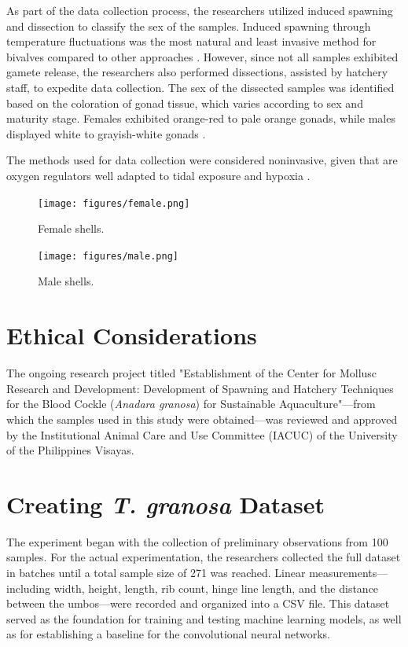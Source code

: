 As part of the data collection process, the researchers utilized induced spawning and dissection to classify the sex of the samples. Induced spawning through temperature fluctuations was the most natural and least invasive method for bivalves compared to other approaches \cite{aji}. However, since not all samples exhibited gamete release, the researchers also performed dissections, assisted by hatchery staff, to expedite data collection. The sex of the dissected samples was identified based on the coloration of gonad tissue, which varies according to sex and maturity stage. Females exhibited orange-red to pale orange gonads, while males displayed white to grayish-white gonads \cite{may2021}.

The methods used for data collection were considered noninvasive, given that \Tgranosa are oxygen regulators well adapted to tidal exposure and hypoxia \cite{davenport1986}.

\begin{figure}[!htbp]
	\centering
	\texttt{[image: figures/female.png]}
	\caption{Female \Tgranosa shells.}
	\label{fig:granosa_femaleshells}
\end{figure}

\begin{figure}[!htbp]
	\centering
	\texttt{[image: figures/male.png]}
	\caption{Male \Tgranosa shells.}
	\label{fig:granosa_maleshells}
\end{figure}

\section{Ethical Considerations}
\label{sec:ethical}

The ongoing research project titled "Establishment of the Center for Mollusc Research and Development: Development of Spawning and Hatchery Techniques for the Blood Cockle (\textit{Anadara granosa}) for Sustainable Aquaculture"—from which the samples used in this study were obtained—was reviewed and approved by the Institutional Animal Care and Use Committee (IACUC) of the University of the Philippines Visayas. 


\section{Creating \textit{T. granosa} Dataset}
\label{sec:dataset}

The experiment began with the collection of preliminary observations from 100 \Tgranosa samples. For the actual experimentation, the researchers collected the full dataset in batches until a total sample size of 271 \Tgranosa was reached. Linear measurements—including width, height, length, rib count, hinge line length, and the distance between the umbos—were recorded and organized into a CSV file. This dataset served as the foundation for training and testing machine learning models, as well as for establishing a baseline for the convolutional neural networks.

